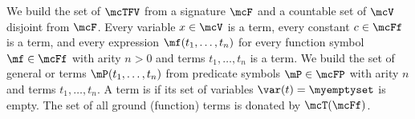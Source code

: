 \begin{definition}
We build the set of  \( \mcTFV \)
from a signature \( \mcF \) and
a countable set of  \( \mcV \) disjoint from \( \mcF \).
Every variable \( x\in\mcV \) is a term,
every constant \( c\in\mcFf \) is a term, and
every expression \( \mf(t_1,\ldots,t_n) \)
for every function symbol \( \mf\in\mcFf \) with arity \( n>0 \)
and terms \( t_1,\ldots,t_n \)
is a term.
%
We build the set of general or  terms \( \mP(t_1,\ldots,t_n) \) from
predicate symbols \( \mP\in\mcFP \) with arity \( n \) and terms \( t_1,\ldots,t_n \).
%
A term is  if its set of variables \( \var(t)=\myemptyset \) is empty.
The set of all ground (function) terms is donated by \( \mcT(\mcFf) \).
\end{definition}


